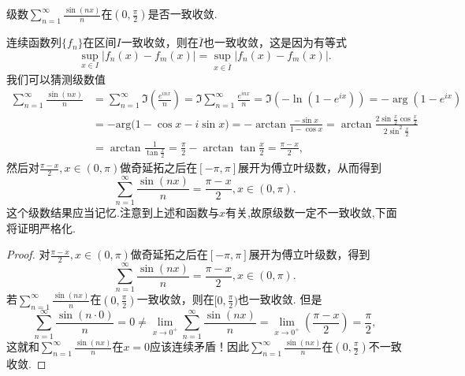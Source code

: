 \documentclass[../../main.tex]{subfiles}%
\begin{document}
\begin{example}
级数\(\sum_{n=1}^{\infty} \frac{\sin(nx)}{n}\)在\((0, \frac{\pi}{2})\)是否一致收敛.
\end{example}
\begin{note}
连续函数列\(\{f_n\}\)在区间\(I\)一致收敛，则在\(\overline{I}\)也一致收敛，这是因为有等式
\[
\sup_{x \in I} |f_n(x) - f_m(x)| = \sup_{x \in \overline{I}} |f_n(x) - f_m(x)|.
\]
我们可以猜测级数值
\begin{align*}
\sum_{n=1}^{\infty} \frac{\sin(nx)}{n} &= \sum_{n=1}^{\infty} \Im \left( \frac{e^{inx}}{n} \right) = \Im \sum_{n=1}^{\infty} \frac{e^{inx}}{n} = \Im (-\ln(1 - e^{ix})) = -\arg(1 - e^{ix}) \\
&= -\mathrm{arg(}1-\cos x-i\sin x)=-\arctan  \frac{-\sin x}{1-\cos x}=\arctan  \frac{2\sin \frac{x}{2}\cos \frac{x}{2}}{2\sin ^2\frac{x}{2}}\\
&= \arctan  \frac{1}{\tan \frac{x}{2}}=\frac{\pi}{2}-\arctan \tan \frac{x}{2}=\frac{\pi -x}{2},
\end{align*}
然后对\(\frac{\pi - x}{2}, x \in (0, \pi)\)做奇延拓之后在\([-\pi, \pi]\)展开为傅立叶级数，从而得到
\[
\sum_{n=1}^{\infty} \frac{\sin(nx)}{n} = \frac{\pi - x}{2}, x \in (0, \pi).
\]
这个级数结果应当记忆.注意到上述和函数与$x$有关,故原级数一定不一致收敛,下面将证明严格化.
\end{note}
\begin{proof}

对\(\frac{\pi - x}{2}, x \in (0, \pi)\)做奇延拓之后在\([-\pi, \pi]\)展开为傅立叶级数，得到
\[
\sum_{n=1}^{\infty} \frac{\sin(nx)}{n} = \frac{\pi - x}{2}, x \in (0, \pi).
\]
若\(\sum_{n=1}^{\infty} \frac{\sin(nx)}{n}\)在\((0, \frac{\pi}{2})\)一致收敛，则在\([0, \frac{\pi}{2})\)也一致收敛. 但是
\[
\sum_{n=1}^{\infty} \frac{\sin(n \cdot 0)}{n} =0 \neq \lim_{x \to 0^+} \sum_{n=1}^{\infty} \frac{\sin(nx)}{n} = \lim_{x \to 0^+} \left( \frac{\pi - x}{2} \right) = \frac{\pi}{2},
\]
这就和\(\sum_{n=1}^{\infty} \frac{\sin(nx)}{n}\)在\(x = 0\)应该连续矛盾！因此\(\sum_{n=1}^{\infty} \frac{\sin(nx)}{n}\)在\((0, \frac{\pi}{2})\)不一致收敛.

\end{proof}
\end{document}
